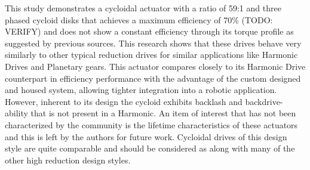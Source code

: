 \documentclass[letterpaper, 10 pt, conference]{ieeeconf}  %
\begin{document}
This study demonstrates a cycloidal actuator with a ratio of 59:1 and three phased cycloid disks that achieves a maximum efficiency of 70\% (TODO: VERIFY) and does not show a constant efficiency through its torque profile as suggested by previous sources. This research shows that these drives behave very similarly to other typical reduction drives for similar applications like Harmonic Drives and Planetary gears. This actuator compares closely to its Harmonic Drive counterpart in efficiency performance with the advantage of the custom designed and housed system, allowing tighter integration into a robotic application. However, inherent to its design the cycloid exhibits backlash and backdrive-ability that is not present in a Harmonic. An item of interest that has not been characterized by the community is the lifetime characteristics of these actuators and this is left by the authors for future work. Cycloidal drives of this design style are quite comparable and should be considered as along with many of the other high reduction design styles. 

\addtolength{\textheight}{-12cm}   %








\end{document}

